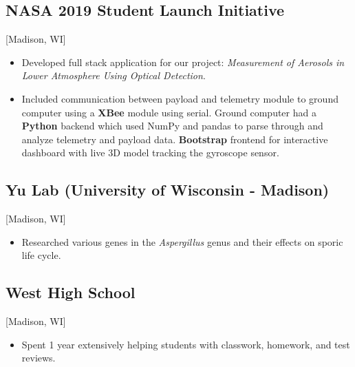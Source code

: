 \documentclass{mycv}
\begin{document}
\subsection{NASA 2019 Student Launch Initiative}[Madison, WI]
\begin{positions}
\end{positions}

\begin{itemize}
  \item Developed full stack application for our project: \textit{Measurement of Aerosols in Lower Atmosphere Using Optical Detection}.  
  \item {
  Included communication between payload and telemetry module to ground computer using a \textbf{XBee} module using serial. Ground computer had a \textbf{Python} backend which used NumPy and pandas to parse through and analyze telemetry and payload data. \textbf{Bootstrap} frontend for interactive dashboard with live 3D model tracking the gyroscope sensor.
  }
\end{itemize}

\subsection{Yu Lab (University of Wisconsin - Madison)}[Madison, WI]
\begin{positions}
\end{positions}

\begin{itemize}
  \item{
  Researched various genes in the \textit{Aspergillus} genus and their effects on sporic life cycle. 
  }
\end{itemize}

\subsection{West High School}[Madison, WI]
\begin{positions}
\end{positions}

\begin{itemize}
  \item{
  Spent 1 year extensively helping students with classwork, homework, and test reviews. 
  }
\end{itemize}
\end{document}

